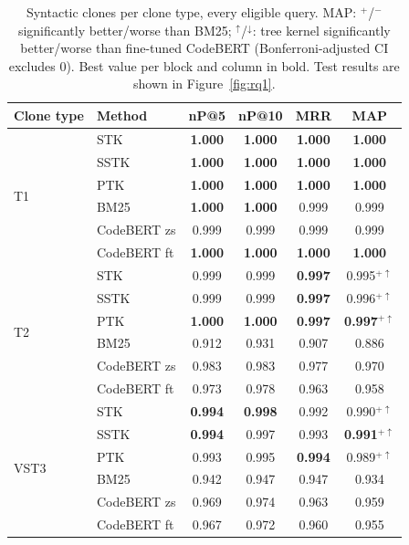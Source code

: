 \begin{table}[!htbp]
\centering
\caption{Syntactic clones per clone type, every eligible query. MAP: $^{+}$/$^{-}$ significantly better/worse than BM25; $^{\uparrow}$/$^{\downarrow}$: tree kernel significantly better/worse than fine-tuned CodeBERT (Bonferroni-adjusted CI excludes 0). Best value per block and column in bold. Test results are shown in Figure~\ref{fig:rq1}.}
\label{tab:rq1}
\footnotesize
\setlength{\tabcolsep}{4pt}
\begin{tabular}{l|lcccc}
\toprule
Clone type & Method & nP@5 & nP@10 & MRR & MAP \\
\midrule
\multirow{6}{*}{T1} & STK & \textbf{1.000} & \textbf{1.000} & \textbf{1.000} & \textbf{1.000} \\
 & SSTK & \textbf{1.000} & \textbf{1.000} & \textbf{1.000} & \textbf{1.000} \\
 & PTK & \textbf{1.000} & \textbf{1.000} & \textbf{1.000} & \textbf{1.000} \\
 & BM25 & \textbf{1.000} & \textbf{1.000} & 0.999 & 0.999 \\
 & CodeBERT zs & 0.999 & 0.999 & 0.999 & 0.999 \\
 & CodeBERT ft & \textbf{1.000} & \textbf{1.000} & \textbf{1.000} & \textbf{1.000} \\
\midrule
\multirow{6}{*}{T2} & STK & 0.999 & 0.999 & \textbf{0.997} & 0.995$^{+\uparrow}$ \\
 & SSTK & 0.999 & 0.999 & \textbf{0.997} & 0.996$^{+\uparrow}$ \\
 & PTK & \textbf{1.000} & \textbf{1.000} & \textbf{0.997} & \textbf{0.997}$^{+\uparrow}$ \\
 & BM25 & 0.912 & 0.931 & 0.907 & 0.886 \\
 & CodeBERT zs & 0.983 & 0.983 & 0.977 & 0.970 \\
 & CodeBERT ft & 0.973 & 0.978 & 0.963 & 0.958 \\
\midrule
\multirow{6}{*}{VST3} & STK & \textbf{0.994} & \textbf{0.998} & 0.992 & 0.990$^{+\uparrow}$ \\
 & SSTK & \textbf{0.994} & 0.997 & 0.993 & \textbf{0.991}$^{+\uparrow}$ \\
 & PTK & 0.993 & 0.995 & \textbf{0.994} & 0.989$^{+\uparrow}$ \\
 & BM25 & 0.942 & 0.947 & 0.947 & 0.934 \\
 & CodeBERT zs & 0.969 & 0.974 & 0.963 & 0.959 \\
 & CodeBERT ft & 0.967 & 0.972 & 0.960 & 0.955 \\
\midrule

\end{tabular}
\end{table}
